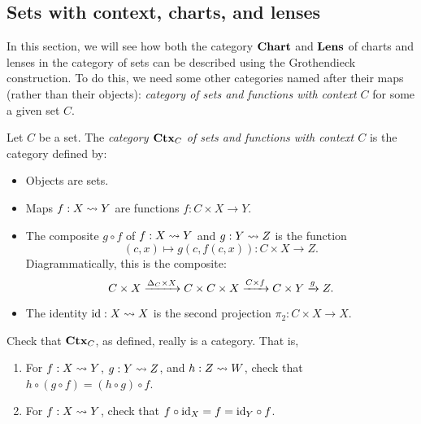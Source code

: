 \documentclass[DynamicalBook]{subfiles}
\begin{document}
\subsection{Sets with context, charts, and lenses}\label{sec.context_indexed_cat}

In this section, we will see how both the category $\textbf{Chart}$ and
$\textbf{Lens}$ of charts and lenses in the category of sets can be described using
the Grothendieck construction. To do this, we need some other categories named
after their maps (rather than their objects): 
\emph{category of sets and functions with context $C$} for some a given set $C$. 

\begin{definition}
  Let $C$ be a set. The \emph{category $\textbf{Ctx}_{C}$ of sets and functions with context $C$}
  is the category defined by:
  \begin{itemize}
    \item Objects are sets.
    \item Maps $f : X \rightsquigarrow Y$ are functions $f : C \times X \to Y$.
    \item The composite $g \circ f$ of $f : X \rightsquigarrow Y$ and $g : Y \rightsquigarrow Z$ is
      the function
       $$(c, x) \mapsto g(c, f(c, x)) : C \times X \to Z.$$
       Diagrammatically, this is the composite:
       $$C \times X \xrightarrow{\Delta_C \times X} C \times C \times X \xrightarrow{C \times f}
       C \times Y \xrightarrow{g} Z.$$
    \item The identity $\mathrm{id} : X \rightsquigarrow X$ is the second projection $\pi_2 : C
      \times X \to X$.
  \end{itemize}
\end{definition}

\begin{exercise}
  Check that $\textbf{Ctx}_{C}$, as defined, really is a category. That is,
  \begin{enumerate}
    \item For $f : X \rightsquigarrow Y$, $g : Y \rightsquigarrow Z$, and $h : Z \rightsquigarrow W$, check
      that $h \circ (g \circ f) = (h \circ g) \circ f$.
    \item For $f : X \rightsquigarrow Y$, check that $f \circ \mathrm{id}_X = f = \mathrm{id}_Y \circ f$.
  \end{enumerate}
\end{exercise}
\end{document}

